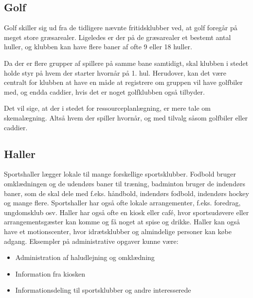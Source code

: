 \subsection{Golf}

Golf skiller sig ud fra de tidligere nævnte fritidsklubber ved, at golf foregår på meget store græsarealer.
Ligeledes er der på de græsarealer et bestemt antal huller, og klubben kan have flere baner af ofte 9 eller 18
huller.

Da der er flere grupper af spillere på samme bane samtidigt, skal klubben i stedet holde styr på hvem der
starter hvornår på 1. hul.  Herudover, kan det være centralt for klubben at have en måde at
registrere om gruppen vil have golfbiler med, og endda caddier, hvis det er noget golfklubben også tilbyder.

Det vil sige, at der i stedet for ressourceplanlægning, er mere tale om skemalægning. Altså hvem der spiller
hvornår, og med tilvalg såsom golfbiler eller caddier.


\subsection{Haller}

Sportshaller lægger lokale til mange forskellige sportsklubber. Fodbold bruger omklædningen og de
udendørs baner til træning, badminton bruger de indendørs baner, som de skal dele med f.eks. håndbold,
indendørs fodbold, indendørs hockey og mange flere. Sportshaller har også ofte lokale arrangementer, f.eks.
foredrag, ungdomsklub osv. Haller har også ofte en kiosk eller café, hvor sportsudøvere eller
arrangementsgæster kan komme og få noget at spise og drikke. Haller kan også have et motionscenter, hvor
idrætsklubber og almindelige personer kan købe adgang\citep{spt_hal}. Eksempler på administrative opgaver
kunne være:

\begin{itemize}
  \item Administration af haludlejning og omklædning 
  \item Information fra kiosken
  \item Informationsdeling til sportsklubber og andre interesserede
\end{itemize}


